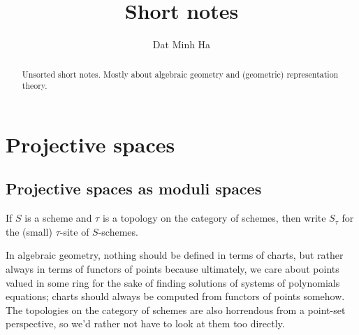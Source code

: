 

\setcounter{section}{0}





    \title{Short notes}
    
    \author{Dat Minh Ha}
    \maketitle
    
    \begin{abstract}
        Unsorted short notes. Mostly about algebraic geometry and (geometric) representation theory.
    \end{abstract}
    
    {
      \hypersetup{} 
      \tableofcontents %
    }

    \section{Projective spaces}
        \subsection{Projective spaces as moduli spaces}
            \begin{convention}
                If $S$ is a scheme and $\tau$ is a topology on the category of schemes, then write $S_{\tau}$ for the (small) $\tau$-site of $S$-schemes.
            \end{convention}
        
            In algebraic geometry, nothing should be defined in terms of charts, but rather always in terms of functors of points because ultimately, we care about points valued in some ring for the sake of finding solutions of systems of polynomials equations; charts should always be computed from functors of points somehow. The topologies on the category of schemes are also horrendous from a point-set perspective, so we'd rather not have to look at them too directly.
            
